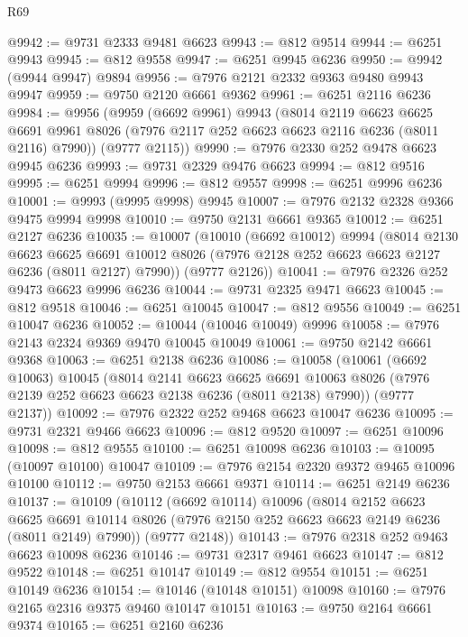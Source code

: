 \begin{lexlean}{R69}
\begin{coremodule}
{@9942 := @9731 @2333 @9481 @6623
@9943 := @812 @9514
@9944 := @6251 @9943
@9945 := @812 @9558
@9947 := @6251 @9945 @6236
@9950 := @9942 (@9944 @9947) @9894
@9956 := @7976 @2121 @2332 @9363 @9480 @9943 @9947
@9959 := @9750 @2120 @6661 @9362
@9961 := @6251 @2116 @6236
@9984 := @9956
    (@9959
      (@6692 @9961)
      @9943
      (@8014
        @2119
        @6623
        @6625
        @6691
        @9961
        @8026
        (@7976 @2117 @252 @6623 @6623 @2116 @6236 (@8011 @2116) @7990))
      (@9777 @2115))
@9990 := @7976 @2330 @252 @9478 @6623 @9945 @6236
@9993 := @9731 @2329 @9476 @6623
@9994 := @812 @9516
@9995 := @6251 @9994
@9996 := @812 @9557
@9998 := @6251 @9996 @6236
@10001 := @9993 (@9995 @9998) @9945
@10007 := @7976 @2132 @2328 @9366 @9475 @9994 @9998
@10010 := @9750 @2131 @6661 @9365
@10012 := @6251 @2127 @6236
@10035 := @10007
    (@10010
      (@6692 @10012)
      @9994
      (@8014
        @2130
        @6623
        @6625
        @6691
        @10012
        @8026
        (@7976 @2128 @252 @6623 @6623 @2127 @6236 (@8011 @2127) @7990))
      (@9777 @2126))
@10041 := @7976 @2326 @252 @9473 @6623 @9996 @6236
@10044 := @9731 @2325 @9471 @6623
@10045 := @812 @9518
@10046 := @6251 @10045
@10047 := @812 @9556
@10049 := @6251 @10047 @6236
@10052 := @10044 (@10046 @10049) @9996
@10058 := @7976 @2143 @2324 @9369 @9470 @10045 @10049
@10061 := @9750 @2142 @6661 @9368
@10063 := @6251 @2138 @6236
@10086 := @10058
    (@10061
      (@6692 @10063)
      @10045
      (@8014
        @2141
        @6623
        @6625
        @6691
        @10063
        @8026
        (@7976 @2139 @252 @6623 @6623 @2138 @6236 (@8011 @2138) @7990))
      (@9777 @2137))
@10092 := @7976 @2322 @252 @9468 @6623 @10047 @6236
@10095 := @9731 @2321 @9466 @6623
@10096 := @812 @9520
@10097 := @6251 @10096
@10098 := @812 @9555
@10100 := @6251 @10098 @6236
@10103 := @10095 (@10097 @10100) @10047
@10109 := @7976 @2154 @2320 @9372 @9465 @10096 @10100
@10112 := @9750 @2153 @6661 @9371
@10114 := @6251 @2149 @6236
@10137 := @10109
    (@10112
      (@6692 @10114)
      @10096
      (@8014
        @2152
        @6623
        @6625
        @6691
        @10114
        @8026
        (@7976 @2150 @252 @6623 @6623 @2149 @6236 (@8011 @2149) @7990))
      (@9777 @2148))
@10143 := @7976 @2318 @252 @9463 @6623 @10098 @6236
@10146 := @9731 @2317 @9461 @6623
@10147 := @812 @9522
@10148 := @6251 @10147
@10149 := @812 @9554
@10151 := @6251 @10149 @6236
@10154 := @10146 (@10148 @10151) @10098
@10160 := @7976 @2165 @2316 @9375 @9460 @10147 @10151
@10163 := @9750 @2164 @6661 @9374
@10165 := @6251 @2160 @6236
}
\end{coremodule}
\end{lexlean}
